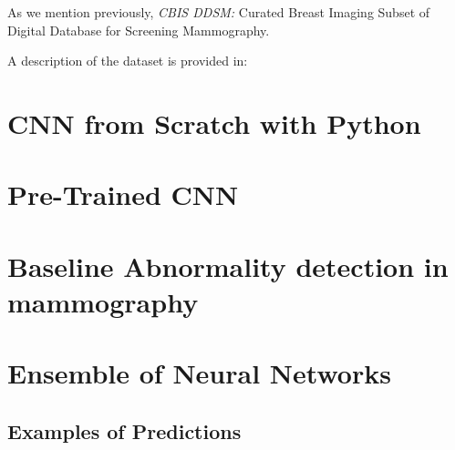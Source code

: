 \documentclass{book}
\begin{document}
    
    As we mention previously,  \textit{CBIS DDSM:} Curated Breast Imaging Subset of Digital Database for Screening Mammography.

    A description of the dataset is provided in:


    \chapter{CNN from Scratch with Python}

    
    \chapter{Pre-Trained CNN}


    \chapter{Baseline Abnormality detection in mammography}


    \chapter{Ensemble of Neural Networks}
    \section{Examples of Predictions}

\end{document}
